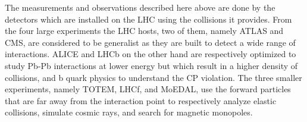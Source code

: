     The measurements and observations described here above are done by the detectors which are installed on the LHC using the collisions it provides. From the four large experiments the LHC hosts, two of them, namely ATLAS and CMS, are considered to be generalist as they are built to detect a wide range of interactions. ALICE and LHCb on the other hand are respectively optimized to study Pb-Pb interactions at lower energy but which result in a higher density of collisions, and b quark physics to understand the CP violation. The three smaller experiments, namely TOTEM, LHCf, and MoEDAL, use the forward particles that are far away from the interaction point to respectively analyze elastic collisions, simulate cosmic rays, and search for magnetic monopoles.
